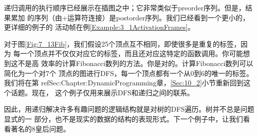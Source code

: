 \begin{example}
\begin{figure*}[!t]
    \caption{斐波纳契数列的递归计算的调用结构}
    \label{Fig:7_13Fib}
\end{figure*}
递归调用的执行顺序已经展示在插图之中；它非常类似于preorder序列。但是，结果累加
的序列（由+运算符连接）是postorder序列。我们已经看到一个更小的，更详细的例子的
活动帧在例\ref{Example:3_1ActivationFrames}。

对于图\ref{Fig:7_13Fib}，我们假设25个顶点互不相同，即使很多是重复的标签，因为
每一个顶点并不仅仅对应它的标签，而且还对应这特定的函数调用。你可能想到这不是高
效率的计算Fibonacci数列的方法。你是对的。计算Fibonacci数列可以简化为一个对7个
顶点的图进行DFS，每一个顶点都有一个从0到6的唯一的标签。我们将在第
ref{Sec:Chapter:DynamicProgramming}章，\ref{Sec:10_2}小节重新回到这个话题。现在，
这个例子仅用来展示DFS和递归之间的联系。

\end{example}

因此，用递归解决许多有趣问题的逻辑结构就是对树的DFS遍历。树并不总是问题显式的一
部分，也不是现实的数据的结构的表现形式。下一个例子中，让我们看看著名的8皇后问题。

